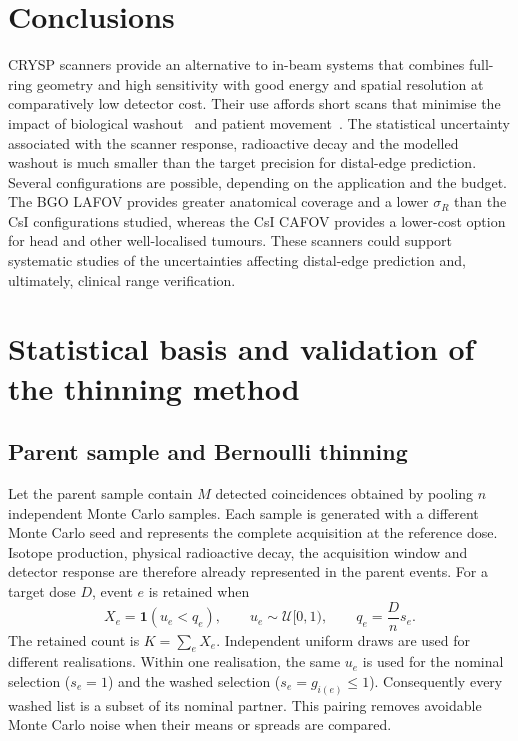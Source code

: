 \documentclass[11pt]{article}
\begin{document}
\FloatBarrier
\section{Conclusions}
\label{sec:conclu}

CRYSP scanners provide an alternative to in-beam systems that combines full-ring geometry and high sensitivity with good energy and spatial resolution at comparatively low detector cost. Their use affords short scans that minimise the impact of biological washout~\cite{Mizuno2003} and patient movement~\cite{Knopf2009}. The statistical uncertainty associated with the scanner response, radioactive decay and the modelled washout is much smaller than the target precision for distal-edge prediction. Several configurations are possible, depending on the application and the budget. The BGO LAFOV provides greater anatomical coverage and a lower $\sigma_R$ than the CsI configurations studied, whereas the CsI CAFOV provides a lower-cost option for head and other well-localised tumours. These scanners could support systematic studies of the uncertainties affecting distal-edge prediction and, ultimately, clinical range verification.

\appendix
\section{Statistical basis and validation of the thinning method}
\label{app:thinning}

\subsection{Parent sample and Bernoulli thinning}

Let the parent sample contain $M$ detected coincidences obtained by pooling
$n$ independent Monte Carlo samples. Each sample is generated with a different Monte Carlo
seed and represents the complete acquisition at the reference dose. Isotope
production, physical radioactive decay, the acquisition window and detector
response are therefore already represented in the parent events. For a target
dose $D$, event $e$ is retained when
%
\begin{equation}
  X_e = \mathbf{1}(u_e<q_e), \qquad
  u_e\sim\mathcal{U}[0,1), \qquad
  q_e=\frac{D}{n}s_e .
  \label{eq:appendix-keep}
\end{equation}
%
The retained count is $K=\sum_e X_e$. Independent uniform draws are used for
different realisations. Within one realisation, the same $u_e$ is used for the
nominal selection ($s_e=1$) and the washed selection
($s_e=g_{i(e)}\leq1$). Consequently every washed list is a subset of its
nominal partner. This pairing removes avoidable Monte Carlo noise when their
means or spreads are compared.
\end{document}
